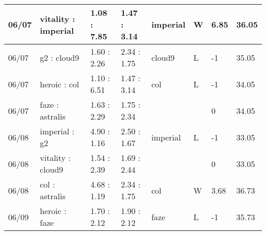 \begin{small}
\begin{longtable}{|l|l|l|l|l|l|l|l|}
	06/07                               & vitality : imperial                 & 1.08 : 7.85                             & 1.47 : 3.14                             & imperial                          & W                                 & 6.85                                 & 36.05                             \\ \hline
	06/07                               & g2 : cloud9                         & 1.60 : 2.26                             & 2.34 : 1.75                             & cloud9                            & L                                 & -1                                   & 35.05                             \\ \hline
	06/07                               & heroic : col                        & 1.10 : 6.51                             & 1.47 : 3.14                             & col                               & L                                 & -1                                   & 34.05                             \\ \hline
	06/07                               & faze : astralis                     & 1.63 : 2.29                             & 1.75 : 2.34                             &                                   &                                   & 0                                    & 34.05                             \\ \hline
	06/08                               & imperial : g2                       & 4.90 : 1.16                             & 2.50 : 1.67                             & imperial                          & L                                 & -1                                   & 33.05                             \\ \hline
	06/08                               & vitality : cloud9                   & 1.54 : 2.39                             & 1.69 : 2.44                             &                                   &                                   & 0                                    & 33.05                             \\ \hline
	06/08                               & col : astralis                      & 4.68 : 1.19                             & 2.34 : 1.75                             & col                               & W                                 & 3.68                                 & 36.73                             \\ \hline
	06/09                               & heroic : faze                       & 1.70 : 2.12                             & 1.90 : 2.12                             & faze                              & L                                 & -1                                   & 35.73                             \\ \hline

\end{longtable}
\end{small}
